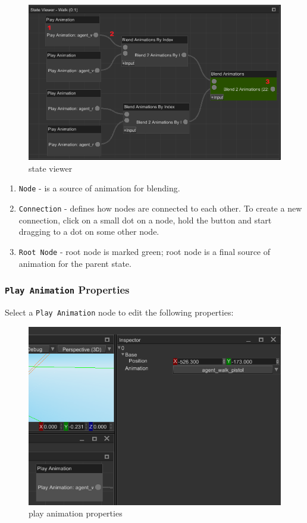 \documentclass[
]{book}
\providecommand{\tightlist}{%
  \setlength{\itemsep}{0pt}\setlength{\parskip}{0pt}}
\theoremstyle{definition}
\theoremstyle{definition}
\theoremstyle{definition}
\theoremstyle{definition}
\theoremstyle{remark}
\begin{document}
\begin{figure}
\centering
\includegraphics{images/animation/absm_state_viewer.png}
\caption{state viewer}
\end{figure}

\begin{enumerate}
\def\labelenumi{\arabic{enumi}.}
\tightlist
\item
  \texttt{Node} - is a source of animation for blending.
\item
  \texttt{Connection} - defines how nodes are connected to each other. To create a new connection, click on a small dot on a node, hold the button and start dragging to a dot on some other node.
\item
  \texttt{Root\ Node} - root node is marked green; root node is a final source of animation for the parent state.
\end{enumerate}

\subsubsection{\texorpdfstring{\texttt{Play\ Animation} Properties}{Play Animation Properties}}\label{play-animation-properties}

Select a \texttt{Play\ Animation} node to edit the following properties:

\begin{figure}
\centering
\includegraphics{images/animation/absm_play_animation_properties.png}
\caption{play animation properties}
\end{figure}
\end{document}
